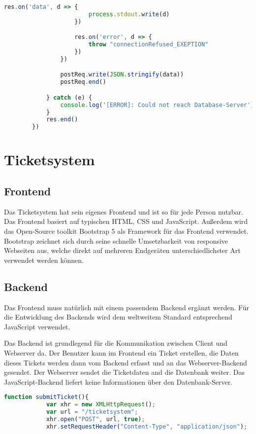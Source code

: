 \documentclass{scrartcl}
\begin{document}
\begin{flushleft}
\begin{lstlisting}[language=JavaScript, caption={Webserver API-Endpunkt: Ticket in Datenbank aufnehmen}, captionpos=t]
                    res.on('data', d => {
                        process.stdout.write(d)
                    })    

                    res.on('error', d => {
                        throw "connectionRefused_EXEPTION"
                    })
                })         

                postReq.write(JSON.stringify(data))
                postReq.end() 

            } catch (e) {
                console.log('[ERROR]: Could not reach Database-Server')
            }
            res.end()
        })\end{lstlisting}

    \newpage

    \section{Ticketsystem}
    \subsection{Frontend}
    Das Ticketsystem hat sein eigenes Frontend und ist so für jede Person nutzbar. Das Frontend basiert auf typischen HTML, CSS und JavaScript. Außerdem wird das Open-Source toolkit Bootstrap 5 als Framework für das Frontend verwendet. Bootstrap zeichnet sich durch seine schnelle Umsetzbarkeit von responsive Webseiten aus, welche direkt auf mehreren Endgeräten unterschiedlichster Art verwendet werden können.   
    
    \subsection{Backend}
    Das Frontend muss natürlich mit einem passendem Backend ergänzt werden. Für die Entwicklung des Backends wird dem weltweitem Standard entsprechend JavaScript verwendet. \newline

    Das Backend ist grundlegend für die Kommunikation zwischen Client und Webserver da. Der Benutzer kann im Frontend ein Ticket erstellen, die Daten dieses Tickets werden dann vom Backend erfasst und an das Webserver-Backend gesendet. Der Webserver sendet die Ticketdaten and die Datenbank weiter.
    Das JavaScript-Backend liefert keine Informationen über den Datenbank-Server.      

    \begin{lstlisting}[language=JavaScript, caption={Backend Funktion: submitTicket}, captionpos=t]
        function submitTicket(){
            var xhr = new XMLHttpRequest();
            var url = "/ticketsystem";
            xhr.open("POST", url, true);
            xhr.setRequestHeader("Content-Type", "application/json");
            

\end{lstlisting}
\end{flushleft}
\end{document}
